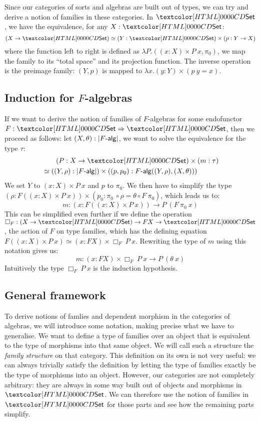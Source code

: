 Since our categories of sorts and algebras are built out of types, we
can try and derive a notion of families in these categories. In
$\Set$, we have the equivalence, for any $X : \Set$:
$$
(X \to \Set) \simeq (Y : \Set) \times (p : Y \to X)
$$
where the function left to right is defined as
$\lambda P . ((x : X) \times P\ x , \pi_0)$, \ie we map the family to
its ``total space'' and its projection function. The inverse operation
is the preimage family: $(Y,p)$ is mapped to
$\lambda x . (y : Y) \times (p\ y = x)$. 

\subsection{Induction for $F$-algebras}
If we want to derive the notion of families of $F$-algebras for some
endofunctor $F : \Func{\Set}{\Set}$, then we proceed as follows: let
$(X,\theta) : | \algcat{F} |$, we want to solve the equivalence for
the type $\tau$:
%
\begin{align*}
&\ \ \ \ \ \ (P : X \to \Set) \times (m : \tau) \\
&\simeq ((Y,\rho) : | \algcat{F} |) \times ((p,p_0) : \algcat{F}((Y,\rho),(X,\theta)))  
\end{align*}
%
We set $Y$ to $(x : X) \times P\ x$ and $p$ to $\pi_0$. We then have
to simplify the type
$(\rho : F ((x : X) \times P\ x)) \times (p_0 : \pi_0\ \circ \rho =
\theta \circ F\ \pi_0)$, which leads us to:
$$
m : (x : F ((x : X) \times P\ x)) \to P\ (F\ \pi_0\ x)
$$
This can be simplified even further if we define the operation
$\Box_F : (X \to \Set) \to FX \to \Set$, \ie the action of $F$ on type
families, which has the defining equation
$F ((x : X) \times P\ x) \simeq (x : FX) \times \Box_F\ P\
x$. Rewriting the type of $m$ using this notation gives us:
$$
m : (x : FX) \times \Box_F\ P\ x \to P\ (\theta\ x)
$$
Intuitively the type $\Box_F\ P\ x$ is the induction hypothesis.

\subsection{General framework}

To derive notions of famlies and dependent morphism in the categories
of algebras, we will introduce some notation, making precise what we
have to generalise. We want to define a type of families over an
object that is equivalent to the type of morphisms into that same
object. We will call such a structure the \emph{family structure} on
that category. This definition on its own is not very useful: we can
always trivially satisfy the definition by letting the type of
families exactly be the type of morphisms into an object. However, our
categories are not completely arbitrary: they are always in some way
built out of objects and morphisms in $\Set$. We can therefore use the
notion of families in $\Set$ for those parts and see how the remaining
parts simplify.

